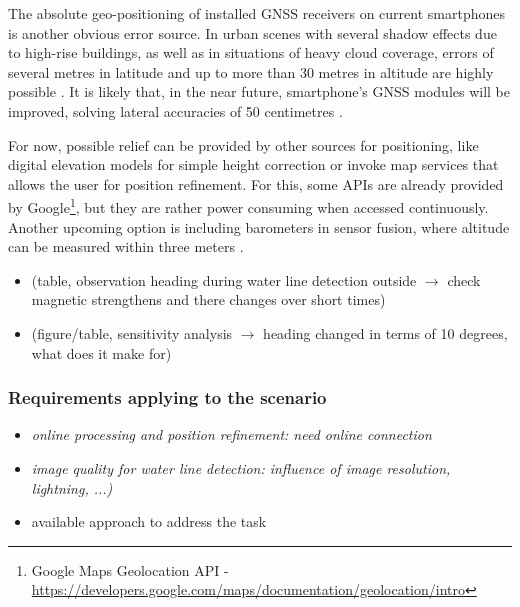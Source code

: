 \documentclass[review]{elsarticle}
\begin{document}
The absolute geo-positioning of installed \gls{GNSS} receivers on current smartphones is another obvious error source. In urban scenes with several shadow effects due to high-rise buildings, as well as in situations of heavy cloud coverage, errors of several metres in latitude and up to more than 30 metres in altitude are highly possible \cite{Bauer2013, Blum2013, Zandbergen2011}. It is likely that, in the near future, smartphone's \gls{GNSS} modules will be improved, solving lateral accuracies of 50 centimetres \cite{Moore2017}.

For now, possible relief can be provided by other sources for positioning, like digital elevation models for simple height correction or invoke map services that allows the user for position refinement. For this, some APIs are already provided by Google\footnote{Google Maps Geolocation API - \url{https://developers.google.com/maps/documentation/geolocation/intro}}, but they are rather power consuming when accessed continuously. Another upcoming option is including barometers in sensor fusion, where altitude can be measured within three meters \cite{Liu2014}.


\begin{itemize}
\item(table, observation heading during water line detection outside $\rightarrow$ check magnetic strengthens and there changes over short times)
\item (figure/table, sensitivity analysis  $\rightarrow$ heading changed in terms of 10 degrees, what does it make for)
\end{itemize}


\subsubsection{Requirements applying to the scenario}
\label{sec:water_level_gauging_requirements_situation}



\begin{itemize}
\item \textit{online processing and position refinement: need online connection}
\item \textit{image quality for water line detection: influence of image resolution, lightning, ...)}
\end{itemize}





\begin{itemize}
\item available approach to address the task
\end{itemize}
\end{document}
